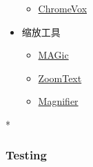 \begin{paracol}{2}
\begin{itemize}
\begin{itemize}
  \item
    \href{https://chrome.google.com/webstore/detail/chromevox-classic-extensi/kgejglhpjiefppelpmljglcjbhoiplfn?hl=en}{ChromeVox}
  \end{itemize}
\item
  缩放工具
  \begin{itemize}
  \item
    \href{https://www.freedomscientific.com/products/software/magic/}{MAGic}
  \item
    \href{https://www.zoomtext.com/}{ZoomText}
  \item
    \href{https://support.microsoft.com/en-us/help/11542/windows-use-magnifier-to-make-things-easier-to-see}{Magnifier}
  \end{itemize}
\end{itemize}
\switchcolumn[0]*%
\subsubsection{Testing}
\switchcolumn

\end{paracol}
